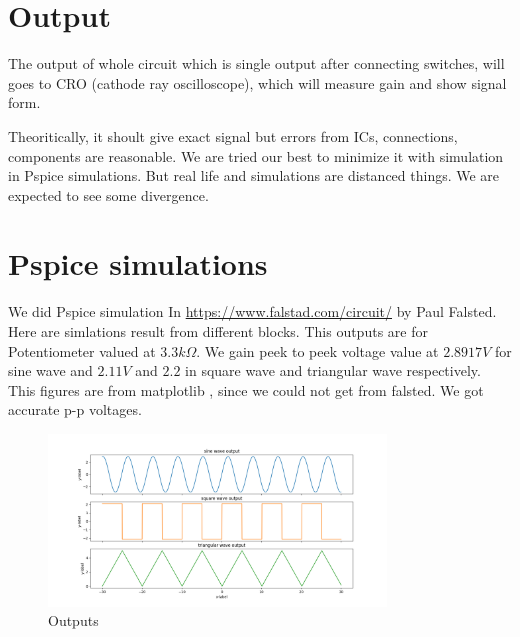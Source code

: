 \documentclass[14pt,a4paper]{extarticle}
\begin{document}
\section{Output}
\label{sec:orgdf73c47}

The output of whole circuit which is single output after connecting switches, will goes to CRO (cathode ray oscilloscope), which will measure gain and show signal form.

Theoritically, it shoult give exact signal but errors from ICs, connections, components are reasonable. We are tried our best to minimize it with simulation in Pspice simulations. But real life and simulations are distanced things. We are expected to see some divergence.

\section{Pspice simulations}
\label{sec:org4550a37}

We did Pspice simulation In \url{https://www.falstad.com/circuit/} \cite{Falsted} by Paul Falsted. Here are simlations result from different blocks. This outputs are for Potentiometer valued at \(3.3k\Omega\). We gain peek to peek voltage value at \(2.8917V\) for sine wave and \(2.11V\) and \(2.2\) in square wave and triangular wave respectively. This figures are from matplotlib \cite{Hunter:2007}\cite{harris2020array}, since we could not get from falsted. We got accurate p-p voltages.

\begin{figure}[H]
    \centering
    \label{outputs}
    \includegraphics[width=0.8\textwidth]{imgs/outputs.png}
    \caption{Outputs}
\end{figure}




\end{document}
